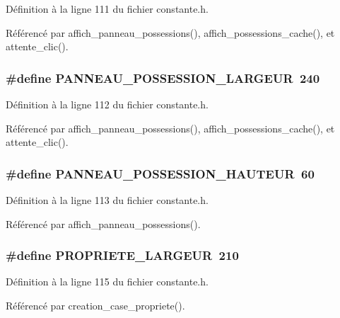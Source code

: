 D\'{e}finition \`{a} la ligne 111 du fichier constante.h.

R\'{e}f\'{e}renc\'{e} par affich\_\-panneau\_\-possessions(), affich\_\-possessions\_\-cache(), et attente\_\-clic().
\subsubsection{\setlength{\rightskip}{0pt plus 5cm}\#define PANNEAU\_\-POSSESSION\_\-LARGEUR~240}\label{constante_8h_8e9cd7773001110309e1b42a1becacac}




D\'{e}finition \`{a} la ligne 112 du fichier constante.h.

R\'{e}f\'{e}renc\'{e} par affich\_\-panneau\_\-possessions(), affich\_\-possessions\_\-cache(), et attente\_\-clic().
\subsubsection{\setlength{\rightskip}{0pt plus 5cm}\#define PANNEAU\_\-POSSESSION\_\-HAUTEUR~60}\label{constante_8h_f3f769f8daa197fde9caeb9721714372}




D\'{e}finition \`{a} la ligne 113 du fichier constante.h.

R\'{e}f\'{e}renc\'{e} par affich\_\-panneau\_\-possessions().
\subsubsection{\setlength{\rightskip}{0pt plus 5cm}\#define PROPRIETE\_\-LARGEUR~210}\label{constante_8h_f7b167d3f01d1bd6218bcfebed58a507}




D\'{e}finition \`{a} la ligne 115 du fichier constante.h.

R\'{e}f\'{e}renc\'{e} par creation\_\-case\_\-propriete().
